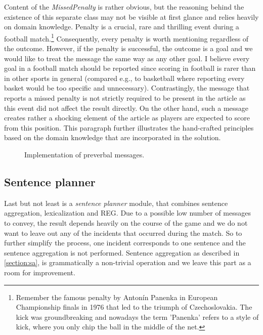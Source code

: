 Content of the \textit{MissedPenalty} is rather obvious, but the reasoning behind the existence of this separate class may not be visible at first glance and relies heavily on domain knowledge. Penalty is a crucial, rare and thrilling event during a football match.\footnote{Remember the famous penalty by Antonín Panenka in European Championship finals in 1976 that led to the triumph of Czechoslovakia. The kick was groundbreaking and nowadays the term 'Panenka' refers to a style of kick, where you only chip the ball in the middle of the net.} Consequently, every penalty is worth mentioning regardless of the outcome. However, if the penalty is successful, the outcome is a goal and we would like to treat the message the same way as any other goal. I believe every goal in a football match should be reported since scoring in football is rarer than in other sports in general (compared e.g., to basketball where reporting every basket would be too specific and unnecessary). Contrastingly, the message that reports a missed penalty is not strictly required to be present in the article as this event did not affect the result directly. On the other hand, such a message creates rather a shocking element of the article as players are expected to score from this position. This paragraph further illustrates the hand-crafted principles based on the domain knowledge that are incorporated in the solution.

\begin{figure}[h]
	\caption{Implementation of preverbal messages.}
	\label{fig:message}
\end{figure} 

\subsection{Sentence planner}
Last but not least is a \textit{sentence planner} module, that combines sentence aggregation, lexicalization and REG. Due to a possible low number of messages to convey, the result depends heavily on the course of the game and we do not want to leave out any of the incidents that occurred during the match. So to further simplify the process, one incident corresponds to one sentence and the sentence aggregation is not performed. Sentence aggregation as described in \ref{section:sa}, is grammatically a non-trivial operation and we leave this part as a room for improvement.


